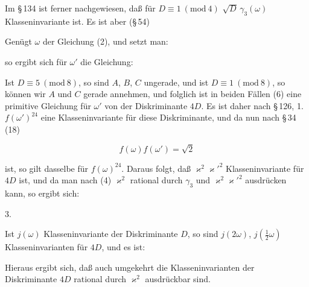 
Im \S\,134 ist ferner nachgewiesen, daß für $D\equiv 1\ (\mathrm{mod}\ 4)$
$\sqrt{D}\,\gamma_3(\omega)$ Klasseninvariante ist. Es ist aber (\S\,54)


Genügt $\omega$ der Gleichung (2), und setzt man:


so ergibt sich für $\omega'$ die Gleichung:


Ist $D\equiv 5\ (\mathrm{mod}\ 8)$, so sind $A$, $B$, $C$ ungerade, und ist
$D\equiv 1\ (\mathrm{mod}\ 8)$, so können wir $A$ und $C$ gerade annehmen, und
folglich ist in beiden Fällen (6) eine primitive Gleichung für $\omega'$
von der Diskriminante $4D$. Es ist daher nach \S\,126, 1. $f(\omega')^{24}$
eine Klasseninvariante für diese Diskriminante, und da nun
nach \S\,34 (18)

\[ f(\omega)f(\omega') = \sqrt{2} \]

ist, so gilt dasselbe für $f(\omega)^{24}$. Daraus folgt, daß $\varkappa^2\varkappa'^2$
Klasseninvariante für $4D$ ist, und da man nach (4) $\varkappa^2$ rational
durch $\gamma_3$ und $\varkappa^2\varkappa'^2$ ausdrücken kann, so ergibt sich:

3. 

Ist $j(\omega)$ Klasseninvariante der Diskriminante $D$, so sind
$j(2\omega)$, $j(\frac{1}{2}\omega)$ Klasseninvarianten für $4D$, und es ist:


Hieraus ergibt sich, daß auch umgekehrt die Klasseninvarianten
der Diskriminante $4D$ rational durch $\varkappa^2$ ausdrückbar sind.
